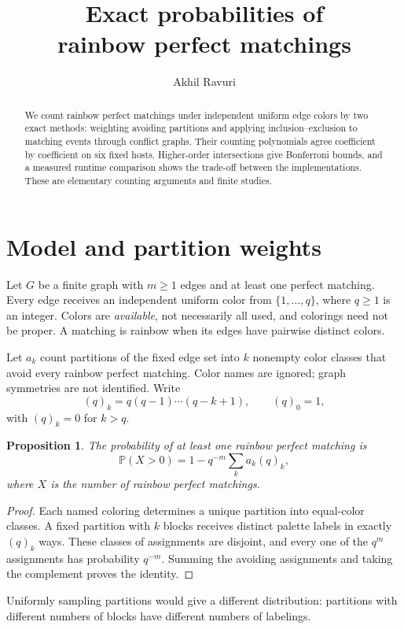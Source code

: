 \documentclass[10pt,letterpaper]{article}
\title{\vspace{-1.5em}\LARGE\bfseries Exact probabilities of\\rainbow perfect matchings}
\author{Akhil Ravuri}\date{}
\newtheorem{proposition}{Proposition}
\newcommand{\Prob}{\mathbb P}
\begin{document}
\maketitle\vspace{-1.5em}
\begin{abstract}
We count rainbow perfect matchings under independent uniform edge colors by
two exact methods: weighting avoiding partitions and applying inclusion--exclusion
to matching events through conflict graphs. Their counting polynomials agree
coefficient by coefficient on six fixed hosts. Higher-order intersections give
Bonferroni bounds, and a measured runtime comparison shows the trade-off between
the implementations. These are elementary counting arguments and finite studies.
\end{abstract}

\section{Model and partition weights}
Let $G$ be a finite graph with $m\ge1$ edges and at least one perfect matching.
Every edge receives an independent uniform color from $\{1,\ldots,q\}$,
where $q\ge1$ is an integer. Colors are \emph{available}, not necessarily all
used, and colorings need not be proper. A matching is rainbow when its edges
have pairwise distinct colors.

Let $a_k$ count partitions of the fixed edge set into $k$ nonempty color
classes that avoid every rainbow perfect matching. Color names are ignored;
graph symmetries are not identified. Write
\[
 (q)_k=q(q-1)\cdots(q-k+1),\qquad (q)_0=1,
\]
with $(q)_k=0$ for $k>q$.
\begin{proposition}\label{prop:weights}
The probability of at least one rainbow perfect matching is
\[
 \Prob(X>0)=1-q^{-m}\sum_k a_k(q)_k,
\]
where $X$ is the number of rainbow perfect matchings.
\end{proposition}
\begin{proof}
Each named coloring determines a unique partition into equal-color classes.
A fixed partition with $k$ blocks receives distinct palette labels in exactly
$(q)_k$ ways. These classes of assignments are disjoint, and every one of the
$q^m$ assignments has probability $q^{-m}$. Summing the avoiding assignments
and taking the complement proves the identity.
\end{proof}
Uniformly sampling partitions would give a different distribution: partitions
with different numbers of blocks have different numbers of labelings.
\end{document}
